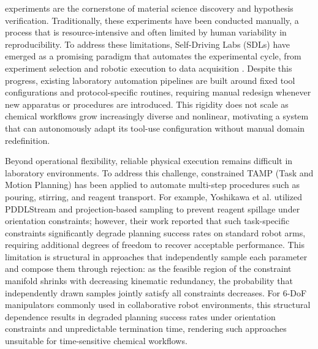 \documentclass{ieeeaccess}
\begin{document}
 experiments are the cornerstone of material science discovery and hypothesis verification. Traditionally, these experiments have been conducted manually, a process that is resource-intensive and often limited by human variability in reproducibility. To address these limitations, Self-Driving Labs (SDLs) have emerged as a promising paradigm that automates the experimental cycle, from experiment selection and robotic execution to data acquisition \cite{bib3, bib4}. Despite this progress, existing laboratory automation pipelines are built around fixed tool configurations and protocol-specific routines, requiring manual redesign whenever new apparatus or procedures are introduced. This rigidity does not scale as chemical workflows grow increasingly diverse and nonlinear, motivating a system that can autonomously adapt its tool-use configuration without manual domain redefinition.

Beyond operational flexibility, reliable physical execution remains difficult in laboratory environments. To address this challenge, constrained TAMP (Task and Motion Planning) \cite{garrett2021integrated, wang2021learning} has been applied to automate multi-step procedures such as pouring, stirring, and reagent transport. For example, Yoshikawa et al. \cite{bib2} utilized PDDLStream \cite{bib5} and projection-based sampling \cite{kingston2019exploring} to prevent reagent spillage under orientation constraints; however, their work reported that such task-specific constraints significantly degrade planning success rates on standard robot arms, requiring additional degrees of freedom to recover acceptable performance. This limitation is structural in approaches that independently sample each parameter and compose them through rejection: as the feasible region of the constraint manifold shrinks with decreasing kinematic redundancy, the probability that independently drawn samples jointly satisfy all constraints decreases. For 6-DoF manipulators commonly used in collaborative robot environments, this structural dependence results in degraded planning success rates under orientation constraints and unpredictable termination time, rendering such approaches unsuitable for time-sensitive chemical workflows.
\end{document}
